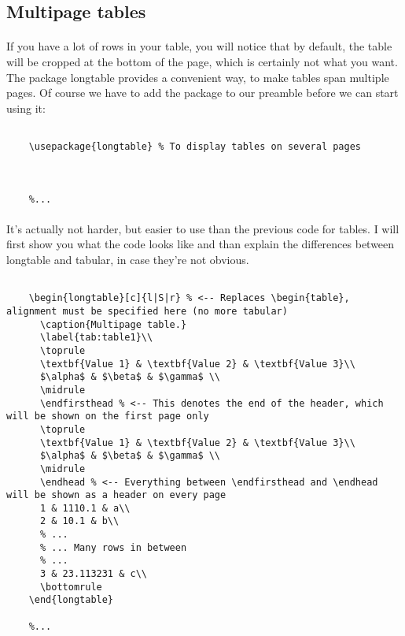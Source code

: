   \subsection{Multipage tables}
  \paragraph{}
  If you have a lot of rows in your table, you will notice that by default, the table will be cropped at the bottom of the page, which is certainly not what you want. The package longtable provides a convenient way, to make tables span multiple pages. Of course we have to add the package to our preamble before we can start using it:
  \begin{lstlisting}[language={[LaTeX]TeX},breaklines=true,frame=single]
    %...

    \usepackage{longtable} % To display tables on several pages
    
     
    
    %...
  \end{lstlisting}
  \paragraph{}
  It's actually not harder, but easier to use than the previous code for tables. I will first show you what the code looks like and than explain the differences between longtable and tabular, in case they're not obvious.
  \begin{lstlisting}[language={[LaTeX]TeX},breaklines=true,frame=single]
    %...

    \begin{longtable}[c]{l|S|r} % <-- Replaces \begin{table}, alignment must be specified here (no more tabular)
      \caption{Multipage table.}
      \label{tab:table1}\\
      \toprule
      \textbf{Value 1} & \textbf{Value 2} & \textbf{Value 3}\\
      $\alpha$ & $\beta$ & $\gamma$ \\
      \midrule
      \endfirsthead % <-- This denotes the end of the header, which will be shown on the first page only
      \toprule
      \textbf{Value 1} & \textbf{Value 2} & \textbf{Value 3}\\
      $\alpha$ & $\beta$ & $\gamma$ \\
      \midrule
      \endhead % <-- Everything between \endfirsthead and \endhead will be shown as a header on every page
      1 & 1110.1 & a\\
      2 & 10.1 & b\\
      % ...
      % ... Many rows in between
      % ...
      3 & 23.113231 & c\\
      \bottomrule
    \end{longtable}
    
    %...
  \end{lstlisting}
